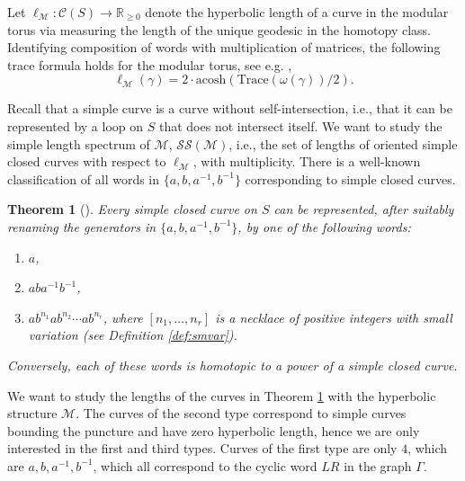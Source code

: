 \documentclass[12pt,reqno]{amsart}
\numberwithin{equation}{part}
\theoremstyle{plain}
\newtheorem{theorem}{Theorem}[part]
\theoremstyle{definition}
\begin{document}
Let $\ell_\mathcal{M}:\mathcal{C}(S)\to \mathbb{R}_{\geq0}$ denote the hyperbolic length of a curve in the modular torus via measuring the length of the unique geodesic in the homotopy class. Identifying composition of words with multiplication of matrices, the following trace formula holds for the modular torus, see e.g. \cite[p.~8]{MS16},
\[
\ell_\mathcal{M}(\gamma)= 2\cdot \mathrm{acosh}(\mathrm{Trace}(\omega(\gamma))/2).
\]

Recall that a simple curve is a curve without self-intersection, i.e., that it can be represented by a loop on $S$ that does not intersect itself. We want to study the simple length spectrum of $\mathcal{M}$, $\mathcal{SS}(\mathcal{M})$, i.e., the set of lengths of oriented simple closed curves with respect to $\ell_\mathcal{M}$, with multiplicity. There is a well-known classification of all words in $\{a,b,a^{-1},b^{-1}\}$ corresponding to simple closed curves.

\begin{theorem}[{\cite[Theorem~6.2]{BS88}}] \label{thm:bus}
    Every simple closed curve on $S$ can be represented, after suitably renaming the generators in $\{a,b,a^{-1},b^{-1}\}$, by one of the following words:
    \begin{enumerate}
        \item \label{type1}
            $a$,

        \item \label{type2}
            $aba^{-1}b^{-1}$,

        \item \label{type}
            $ab^{n_1} a b^{n_2} \cdots a b^{n_r}$, where $[n_1, \dots, n_r]$ is a necklace of positive integers with small variation (see Definition \ref{def:smvar}).
    \end{enumerate}
    Conversely, each of these words is homotopic to a power of a simple closed curve.
\end{theorem}

We want to study the lengths of the curves in Theorem \ref{thm:bus} with the hyperbolic structure $\mathcal{M}$. The curves of the second type correspond to simple curves bounding the puncture and have zero hyperbolic length, hence we are only interested in the first and third types. Curves of the first type are only $4$, which are $a,b,a^{-1},b^{-1}$, which all correspond to the cyclic word $LR$ in the graph $\Gamma$. 
\end{document}
